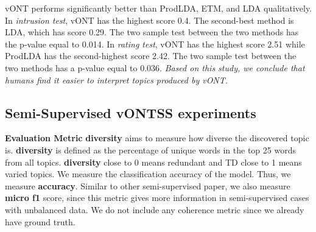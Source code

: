 \documentclass[11pt]{article}
\begin{document}
vONT performs significantly better than ProdLDA, ETM, and LDA qualitatively. In \textit{intrusion test}, vONT has the highest score 0.4. The second-best method is LDA, which has score 0.29. The two sample test between the two methods has the p-value equal to 0.014.  In \textit{rating test}, vONT has the highest score 2.51 while ProdLDA has the second-highest score 2.42.  The two sample test between the two methods has a p-value equal to 0.036. \textit{Based on this study, we conclude that humans find it easier to interpret topics produced by vONT.}

\subsection{Semi-Supervised vONTSS experiments}
\textbf{Evaluation Metric}
\textbf{diversity} aims to measure how diverse the discovered topic is. \textbf{diversity} is defined as the percentage of unique words in the top 25 words from all topics.\cite{dieng2020topic} \textbf{diversity} close to 0 means redundant and TD close to 1 means varied topics.  We measure the classification accuracy of the model. Thus, we measure \textbf{accuracy}. Similar to other semi-supervised paper\cite{meng2018weakly}, we also measure \textbf{micro f1} score, since this metric gives more information in semi-supervised cases with unbalanced data. We do not include any coherence metric since we already have ground truth.
\end{document}

